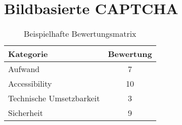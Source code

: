 \section{Bildbasierte CAPTCHA}


\begin{table}[h!]
    \caption{Beispielhafte Bewertungsmatrix}
    \begin{center}
        \begin{tabular}{l|c}
            Kategorie                       & Bewertung \\\hline
            Aufwand                         & 7         \\
            Accessibility                   & 10        \\
            Technische Umsetzbarkeit        & 3         \\
            Sicherheit                      & 9         
        \end{tabular}
    \end{center}
\end{table}



